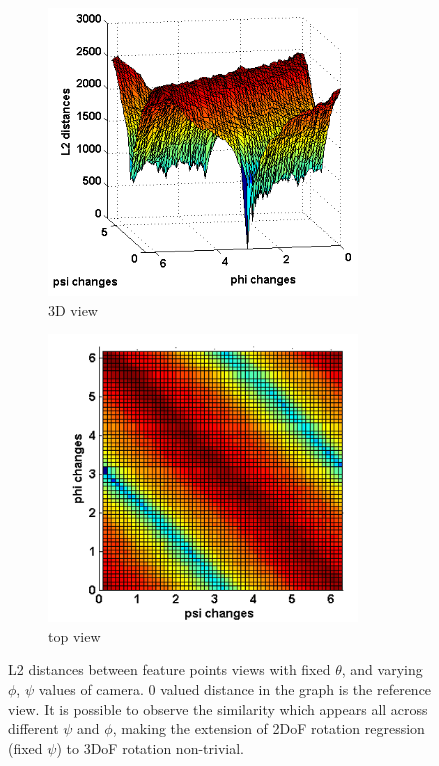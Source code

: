 \documentclass[annual]{acmsiggraph}
\begin{document}
\begin{figure}[h]
\center
\begin{subfigure}{0.5\columnwidth} \center \includegraphics[width=0.9\textwidth]{images/L2dists_psi_phi_changes_30_img.png} 
\caption{3D view} 
\label{img:diffL2:3D}
\end{subfigure}%
\begin{subfigure}{0.5\columnwidth} \center \includegraphics[width=0.9\textwidth]{images/L2dists_psi_phi_changes_30_img_top.png} 
\caption{top view}
\label{img:diffL2:top}
\end{subfigure}%
\caption{L2 distances between feature points views with fixed $\theta$, and varying $\phi$, $\psi$ values of camera. $0$ valued distance in the graph is the reference view. It is possible to observe the similarity which appears all across different $\psi$ and $\phi$, making the extension of 2DoF rotation regression (fixed $\psi$) to 3DoF rotation non-trivial.}
\label{img:diffL2}
\end{figure}
\end{document}
